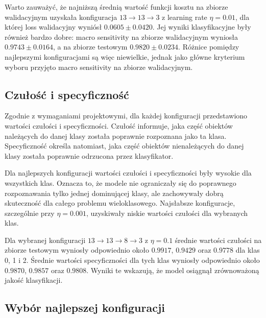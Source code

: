 Warto zauważyć, że najniższą średnią wartość funkcji kosztu na zbiorze
walidacyjnym uzyskała konfiguracja \(13 \rightarrow 13 \rightarrow 3\) z
learning rate \(\eta = 0.01\), dla której loss walidacyjny wyniósł
\(0.0605 \pm 0.0420\). Jej wyniki klasyfikacyjne były również bardzo dobre:
macro sensitivity na zbiorze walidacyjnym wyniosła \(0.9743 \pm 0.0164\),
a na zbiorze testowym \(0.9820 \pm 0.0234\). Różnice pomiędzy najlepszymi
konfiguracjami są więc niewielkie, jednak jako główne kryterium wyboru przyjęto
macro sensitivity na zbiorze walidacyjnym.

\subsection{Czułość i specyficzność}

Zgodnie z wymaganiami projektowymi, dla każdej konfiguracji przedstawiono
wartości czułości i specyficzności. Czułość informuje, jaka część obiektów
należących do danej klasy została poprawnie rozpoznana jako ta klasa.
Specyficzność określa natomiast, jaka część obiektów nienależących do danej
klasy została poprawnie odrzucona przez klasyfikator.

\begin{table}[H]
    \centering
    
    \caption{Czułość i specyficzność dla analizowanych konfiguracji}
    \label{tab:sensitivity_specificity_summary}
\end{table}

Dla najlepszych konfiguracji wartości czułości i specyficzności były wysokie
dla wszystkich klas. Oznacza to, że modele nie ograniczały się do poprawnego
rozpoznawania tylko jednej dominującej klasy, ale zachowywały dobrą skuteczność
dla całego problemu wieloklasowego. Najsłabsze konfiguracje, szczególnie przy
\(\eta = 0.001\), uzyskiwały niskie wartości czułości dla wybranych klas.

Dla wybranej konfiguracji
\(13 \rightarrow 13 \rightarrow 8 \rightarrow 3\) z \(\eta = 0.1\) średnie wartości
czułości na zbiorze testowym wyniosły odpowiednio około \(0.9917\), \(0.9429\) oraz
\(0.9778\) dla klas 0, 1 i 2. Średnie wartości specyficzności dla tych klas
wyniosły odpowiednio około \(0.9870\), \(0.9857\) oraz \(0.9808\). Wyniki te wskazują,
że model osiągnął zrównoważoną jakość klasyfikacji.

\subsection{Wybór najlepszej konfiguracji}

